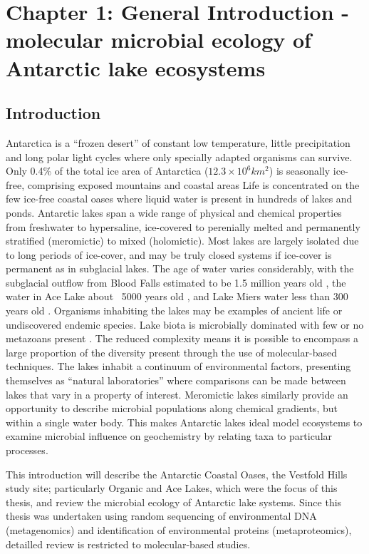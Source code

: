\documentclass{book}
\begin{document}
\section{Chapter 1: General Introduction - molecular microbial ecology of Antarctic lake ecosystems}

\subsection{Introduction}

Antarctica is a ``frozen desert'' of constant low temperature, little precipitation and long polar light cycles where only specially adapted organisms can survive.
Only 0.4\% of the total ice area of Antarctica ($12.3 × 10^6 km^2$) is seasonally ice-free, comprising exposed mountains and coastal areas%
Life is concentrated on the few ice-free coastal oases where liquid water is present in hundreds of lakes and ponds. 
Antarctic lakes span a wide range of physical and chemical properties from freshwater to hypersaline, ice-covered to perenially melted and permanently stratified (meromictic) to mixed (holomictic).
Most lakes are largely isolated due to long periods of ice-cover, and may be truly closed systems if ice-cover is permanent as in subglacial lakes. 
The age of water varies considerably, with the subglacial outflow from Blood Falls estimated to be 1.5 million years old \cite{Mickucki, 2009}, the water in Ace Lake about ~5000 years old \cite{Rankin1999}, and Lake Miers water less than 300 years old \cite{Green1988}. 
Organisms inhabiting the lakes may be examples of ancient life or undiscovered endemic species.
Lake biota is microbially dominated with few or no metazoans present \cite{Laybourne-Parry1997}.
The reduced complexity means it is possible to encompass a large proportion of the diversity present through the use of molecular-based techniques.
The lakes inhabit a continuum of environmental factors, presenting themselves as ``natural laboratories'' where comparisons can be made between lakes that vary in a property of interest. 
Meromictic lakes similarly provide an opportunity to describe microbial populations along chemical gradients, but within a single water body. 
This makes Antarctic lakes ideal model ecosystems to examine microbial influence on geochemistry by relating taxa to particular processes\cite{Laybourne-Parry2007}.

This introduction will describe the Antarctic Coastal Oases, the Vestfold Hills study site; particularly Organic and Ace Lakes, which were the focus of this thesis, and review the microbial ecology of Antarctic lake systems. 
Since this thesis was undertaken using random sequencing of environmental DNA (metagenomics) and identification of environmental proteins (metaproteomics), detailled review is restricted to molecular-based studies.
\end{document}
